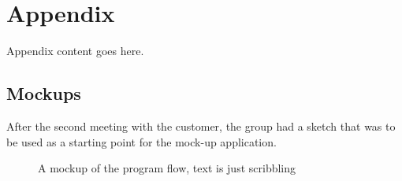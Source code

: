 \appendix

\chapter{Appendix}
Appendix content goes here.

\section{Mockups}
After the second meeting with the customer, the group had a sketch that was to be used as a starting point for the mock-up application.
\pagebreak
\begin{figure}[here]
\setlength\fboxsep{0pt}
\setlength\fboxrule{1pt}
\caption{A mockup of the program flow, text is just scribbling}
\label{fig:mockupV2}
\end{figure}


